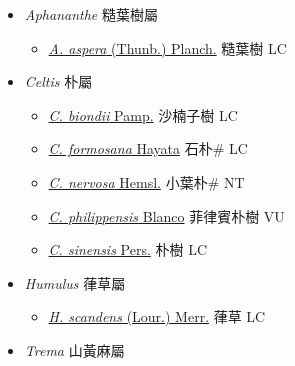 
  \begin{itemize}
 \item[] \textit{Aphananthe} 糙葉樹屬
                    
  \begin{itemize}
        \item[] \href{http://www.theplantlist.org/tpl1.1/search?q=Aphananthe+aspera}{\textit{A. aspera} (Thunb.) Planch.}   糙葉樹 LC
  \end{itemize}
 \item[] \textit{Celtis} 朴屬
                    
  \begin{itemize}
        \item[] \href{http://www.theplantlist.org/tpl1.1/search?q=Celtis+biondii}{\textit{C. biondii} Pamp.}   沙楠子樹 LC
        \item[] \href{http://www.theplantlist.org/tpl1.1/search?q=Celtis+formosana}{\textit{C. formosana} Hayata}   石朴\# LC
        \item[] \href{http://www.theplantlist.org/tpl1.1/search?q=Celtis+nervosa}{\textit{C. nervosa} Hemsl.}   小葉朴\# NT
        \item[] \href{http://www.theplantlist.org/tpl1.1/search?q=Celtis+philippensis}{\textit{C. philippensis} Blanco}   菲律賓朴樹 VU
        \item[] \href{http://www.theplantlist.org/tpl1.1/search?q=Celtis+sinensis}{\textit{C. sinensis} Pers.}   朴樹 LC
  \end{itemize}
 \item[] \textit{Humulus} 葎草屬
                    
  \begin{itemize}
        \item[] \href{http://www.theplantlist.org/tpl1.1/search?q=Humulus+scandens}{\textit{H. scandens} (Lour.) Merr.}   葎草 LC
  \end{itemize}
 \item[] \textit{Trema} 山黃麻屬
                    

\end{itemize}
